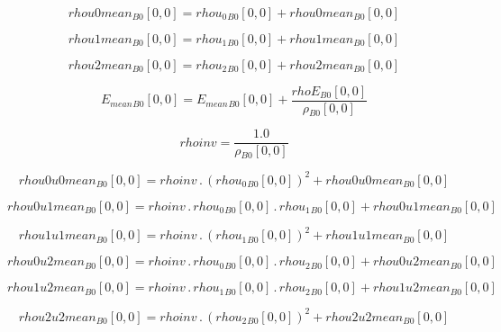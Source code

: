 \documentclass{article}
\begin{document}
\begin{dmath}{rhou0mean{_{B0}}}[{0,0}] = {rhou_{0}{_{B0}}}[{0,0}] + {rhou0mean{_{B0}}}[{0,0}]\end{dmath}

\begin{dmath}{rhou1mean{_{B0}}}[{0,0}] = {rhou_{1}{_{B0}}}[{0,0}] + {rhou1mean{_{B0}}}[{0,0}]\end{dmath}

\begin{dmath}{rhou2mean{_{B0}}}[{0,0}] = {rhou_{2}{_{B0}}}[{0,0}] + {rhou2mean{_{B0}}}[{0,0}]\end{dmath}

\begin{dmath}{E_{mean}{_{B0}}}[{0,0}] = {E_{mean}{_{B0}}}[{0,0}] + \frac{{rhoE{_{B0}}}[{0,0}]}{{\rho{_{B0}}}[{0,0}]}\end{dmath}

\begin{dmath}rhoinv = \frac{1.0}{{\rho{_{B0}}}[{0,0}]}\end{dmath}

\begin{dmath}{rhou0u0mean{_{B0}}}[{0,0}] = rhoinv \,.\, \left({rhou_{0}{_{B0}}}[{0,0}] \right)^{2} + {rhou0u0mean{_{B0}}}[{0,0}]\end{dmath}

\begin{dmath}{rhou0u1mean{_{B0}}}[{0,0}] = rhoinv \,.\, {rhou_{0}{_{B0}}}[{0,0}] \,.\, {rhou_{1}{_{B0}}}[{0,0}] + {rhou0u1mean{_{B0}}}[{0,0}]\end{dmath}

\begin{dmath}{rhou1u1mean{_{B0}}}[{0,0}] = rhoinv \,.\, \left({rhou_{1}{_{B0}}}[{0,0}] \right)^{2} + {rhou1u1mean{_{B0}}}[{0,0}]\end{dmath}

\begin{dmath}{rhou0u2mean{_{B0}}}[{0,0}] = rhoinv \,.\, {rhou_{0}{_{B0}}}[{0,0}] \,.\, {rhou_{2}{_{B0}}}[{0,0}] + {rhou0u2mean{_{B0}}}[{0,0}]\end{dmath}

\begin{dmath}{rhou1u2mean{_{B0}}}[{0,0}] = rhoinv \,.\, {rhou_{1}{_{B0}}}[{0,0}] \,.\, {rhou_{2}{_{B0}}}[{0,0}] + {rhou1u2mean{_{B0}}}[{0,0}]\end{dmath}

\begin{dmath}{rhou2u2mean{_{B0}}}[{0,0}] = rhoinv \,.\, \left({rhou_{2}{_{B0}}}[{0,0}] \right)^{2} + {rhou2u2mean{_{B0}}}[{0,0}]\end{dmath}
\end{document}

